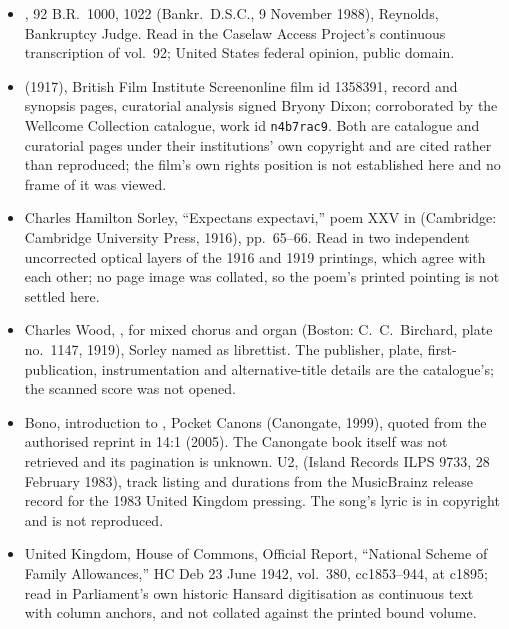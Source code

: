 \begin{itemize}
\item {}, 92 B.R.\ 1000, 1022 (Bankr.\ D.S.C., 9 November 1988),
Reynolds, Bankruptcy Judge. Read in the Caselaw Access Project's continuous
transcription of  vol.~92; United States federal
opinion, public domain.
\item {} (1917), British Film Institute Screenonline
film id 1358391, record and synopsis pages, curatorial analysis signed Bryony
Dixon; corroborated by the Wellcome Collection catalogue, work id
\texttt{n4b7rac9}. Both are catalogue and curatorial pages under their
institutions' own copyright and are cited rather than reproduced; the film's own
rights position is not established here and no frame of it was viewed.
\item Charles Hamilton Sorley, ``Expectans expectavi,'' poem XXV in
 (Cambridge: Cambridge University Press, 1916),
pp.~65--66. Read in two independent uncorrected optical layers of the 1916 and
1919 printings, which agree with each other; no page image was collated, so the
poem's printed pointing is not settled here.
\item Charles Wood, , for mixed chorus and organ
(Boston: C.~C.\ Birchard, plate no.~1147, 1919), Sorley named as librettist. The
publisher, plate, first-publication, instrumentation and alternative-title
details are the catalogue's; the scanned score was not opened.
\item Bono, introduction to , Pocket Canons (Canongate, 1999), quoted from the authorised
reprint in  14:1 (2005). The Canongate book itself was
not retrieved and its pagination is unknown. U2,  (Island Records ILPS
9733, 28 February 1983), track listing and durations from the MusicBrainz release
record for the 1983 United Kingdom pressing. The song's lyric is in copyright and
is not reproduced.
\item United Kingdom, House of Commons, Official Report, ``National Scheme of
Family Allowances,'' HC Deb 23 June 1942, vol.~380, cc1853--944, at c1895; read
in Parliament's own historic Hansard digitisation as continuous text with column
anchors, and not collated against the printed bound volume.
\end{itemize}
